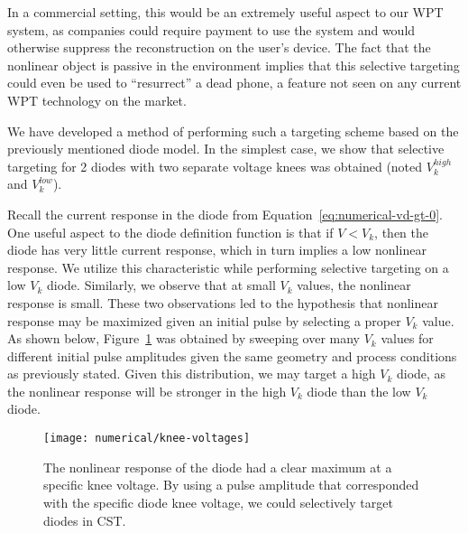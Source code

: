 In a commercial setting, this would be an extremely useful aspect to our WPT system, as companies could require payment to use the system and would otherwise suppress the reconstruction on the user's device. The fact that the nonlinear object is passive in the environment implies that this selective targeting could even be used to ``resurrect'' a dead phone, a feature not seen on any current WPT technology on the market.

We have developed a method of performing such a targeting scheme based on the previously mentioned diode model. In the simplest case, we show that selective targeting for 2 diodes with two separate voltage knees was obtained (noted $V_k^{high}$ and $V_k^{low}$).

Recall the current response in the diode from Equation~\ref{eq:numerical-vd-gt-0}. One useful aspect to the diode definition function is that if $V < V_{k}$, then the diode has very little current response, which in turn implies a low nonlinear response. We utilize this characteristic while performing selective targeting on a low $V_{k}$ diode. Similarly, we observe that at small $V_{k}$ values, the nonlinear response is small. These two observations led to the hypothesis that nonlinear response may be maximized given an initial pulse by selecting a proper $V_{k}$ value. As shown below, Figure~\ref{fig:numerical-knee-voltages} was obtained by sweeping over many $V_{k}$ values for different initial pulse amplitudes given the same geometry and process conditions as previously stated. Given this distribution, we may target a high $V_{k}$ diode, as the nonlinear response will be stronger in the high $V_{k}$ diode than the low $V_{k}$ diode.

\begin{figure}[t]
\centering
\texttt{[image: numerical/knee-voltages]}
\caption[Nonlinear response due to different diode settings]{The nonlinear response of the diode had a clear maximum at a specific knee voltage. By using a pulse amplitude that corresponded with the specific diode knee voltage, we could selectively target diodes in CST.}
\label{fig:numerical-knee-voltages}
\end{figure}


